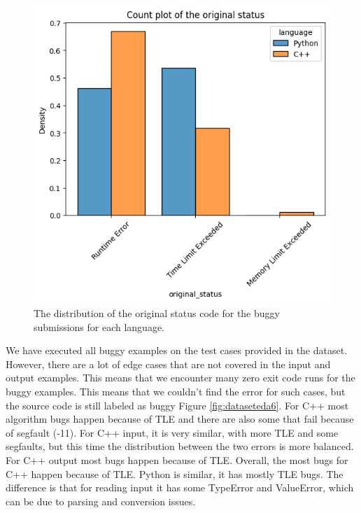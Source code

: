 \documentclass[12pt,a4paper]{report}
\begin{document}
\begin{figure}[hp!]
\centering
\includegraphics[width=\textwidth]{pics/submissionstatus.png}
  \caption{The distribution of the original status code for the buggy submissions for each language.}
  \label{fig:dataseteda5}
\end{figure}

\newpage

We have executed all buggy examples on the test cases provided in the dataset. However, there are a lot of edge cases that are not covered in the input and output examples. This means that we encounter many zero exit code runs for the buggy examples. This means that we couldn't find the error for such cases, but the source code is still labeled as buggy Figure \ref{fig:dataseteda6}. For C++ most algorithm bugs happen because of TLE and there are also some that fail because of segfault (-11). For C++ input, it is very similar, with more TLE and some segfaults, but this time the distribution between the two errors is more balanced. For C++ output most bugs happen because of TLE. Overall, the most bugs for C++ happen because of TLE. Python is similar, it has mostly TLE bugs. The difference is that for reading input it has some TypeError and ValueError, which can be due to parsing and conversion issues.
\end{document}
